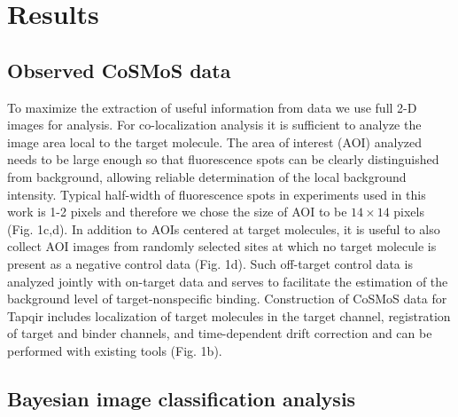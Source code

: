 \section*{Results}

\subsection*{Observed CoSMoS data} %


To maximize the extraction of useful information from data we use full 2-D images for analysis. For co-localization analysis it is sufficient to analyze the image area local to the target molecule. The area of interest (AOI) analyzed needs to be large enough so that fluorescence spots can be clearly distinguished from background, allowing  reliable  determination of the  local  background  intensity. Typical half-width of fluorescence spots in experiments used in this work is 1-2 pixels and therefore we chose the size of AOI to be $14\times14$ pixels (Fig. 1c,d). In addition to AOIs centered at target molecules, it is useful to also collect AOI images from randomly selected sites at which no target molecule is present as a negative control data (Fig. 1d). Such off-target control data is analyzed jointly with on-target data and serves to facilitate the estimation of the background level of target-nonspecific binding. Construction of CoSMoS data for Tapqir includes localization of target molecules in the target channel, registration of target and binder channels, and time-dependent drift correction and can be performed with existing tools \cite{Friedman2015-nx, Smith2019-yb} (Fig. 1b).


\subsection*{Bayesian image classification analysis}


